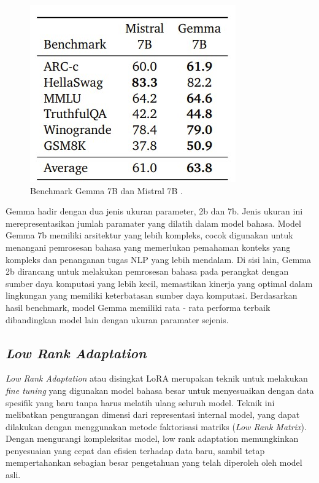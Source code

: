\begin{figure}[H]
  \centering

  \includegraphics[scale=1]{gambar/gemma-bench.jpg}

  \caption{Benchmark Gemma 7B dan Mistral 7B \parencite{gemma}.}
\end{figure}

Gemma hadir dengan dua jenis ukuran parameter, 2b dan 7b. Jenis ukuran ini merepresentasikan jumlah paramater yang dilatih dalam model bahasa. Model Gemma 7b memiliki arsitektur yang lebih kompleks, cocok digunakan untuk menangani pemrosesan bahasa yang memerlukan pemahaman konteks yang kompleks dan penanganan tugas NLP yang lebih mendalam. Di sisi lain, Gemma 2b dirancang untuk melakukan pemrosesan bahasa pada perangkat dengan sumber daya komputasi yang lebih kecil, memastikan kinerja yang optimal dalam lingkungan yang memiliki keterbatasan sumber daya komputasi. Berdasarkan hasil benchmark, model Gemma memiliki rata - rata performa terbaik dibandingkan model lain dengan ukuran paramater sejenis.

\subsection{\textit{Low Rank Adaptation}}

\textit{Low Rank Adaptation} atau disingkat LoRA merupakan teknik untuk melakukan \textit{fine tuning} yang digunakan model bahasa besar untuk menyesuaikan dengan data spesifik yang baru tanpa harus melatih ulang seluruh model. Teknik ini melibatkan pengurangan dimensi dari representasi internal model, yang dapat dilakukan dengan menggunakan metode faktorisasi matriks (\textit{Low Rank Matrix}). Dengan mengurangi kompleksitas model, low rank adaptation memungkinkan penyesuaian yang cepat dan efisien terhadap data baru, sambil tetap mempertahankan sebagian besar pengetahuan yang telah diperoleh oleh model asli.

